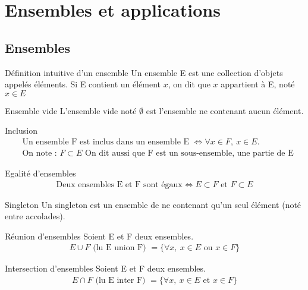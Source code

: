 \chapter{Ensembles et applications}
\section{Ensembles}
\begin{definition}{Définition intuitive d'un ensemble}
	Un ensemble E est une collection d'objets appelés éléments.
	Si E contient un élément $x$, on dit que $x$ appartient à E, noté $x \in E$ 
\end{definition}
\begin{definition}{Ensemble vide}
	L'ensemble vide noté $\emptyset$ est l'ensemble ne contenant aucun élément.
\end{definition}
\begin{definition}{Inclusion}
	\begin{align*}
		&\text{Un ensemble F est inclus dans un ensemble E } \iff \forall x \in F,\ x \in E. \\
		&\text{On note : } F \subset E \text{ On dit aussi que F est un sous-ensemble, une partie de E}
	\end{align*}
\end{definition}
\begin{definition}{Egalité d'ensembles}
	\begin{align*}
		\text{Deux ensembles E et F sont égaux} \iff E \subset F \text{ et } F \subset E
	\end{align*} 
\end{definition}
\begin{definition}{Singleton}
	Un singleton est un ensemble de ne contenant qu'un seul élément (noté entre accolades).
\end{definition}
\begin{definition}{Réunion d'ensembles}
	Soient E et F deux ensembles.
	\begin{align*}
		E \cup F \text{ (lu E union F) } = \{\forall x,\ x \in E \text{ ou } x \in F \}
	\end{align*}
\end{definition}
\begin{definition}{Intersection d'ensembles}
	Soient E et F deux ensembles.
	\begin{align*}
		E \cap F \text{ (lu E inter F) } = \{\forall x,\ x \in E \text{ et } x \in F \}
	\end{align*}
\end{definition}
